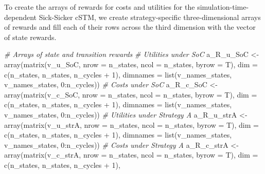 \documentclass[
]{article}
\newenvironment{Shaded}{\begin{snugshade}}{\end{snugshade}}
\newcommand{\AttributeTok}[1]{\textcolor[rgb]{0.77,0.63,0.00}{#1}}
\newcommand{\CommentTok}[1]{\textcolor[rgb]{0.56,0.35,0.01}{\textit{#1}}}
\newcommand{\DecValTok}[1]{\textcolor[rgb]{0.00,0.00,0.81}{#1}}
\newcommand{\FunctionTok}[1]{\textcolor[rgb]{0.00,0.00,0.00}{#1}}
\newcommand{\NormalTok}[1]{#1}
\newcommand{\OtherTok}[1]{\textcolor[rgb]{0.56,0.35,0.01}{#1}}
\newcommand{\SpecialCharTok}[1]{\textcolor[rgb]{0.00,0.00,0.00}{#1}}
\begin{document}
To create the arrays of rewards for costs and utilities for the simulation-time-dependent Sick-Sicker cSTM, we create strategy-specific three-dimensional arrays of rewards and fill each of their rows across the third dimension with the vector of state rewards.

\begin{Shaded}
\begin{Highlighting}[]
\CommentTok{\# Arrays of state and transition rewards}
\CommentTok{\# Utilities under SoC}
\NormalTok{a\_R\_u\_SoC }\OtherTok{\textless{}{-}} \FunctionTok{array}\NormalTok{(}\FunctionTok{matrix}\NormalTok{(v\_u\_SoC, }\AttributeTok{nrow =}\NormalTok{ n\_states, }\AttributeTok{ncol =}\NormalTok{ n\_states, }\AttributeTok{byrow =}\NormalTok{ T), }
                  \AttributeTok{dim =} \FunctionTok{c}\NormalTok{(n\_states, n\_states, n\_cycles }\SpecialCharTok{+} \DecValTok{1}\NormalTok{),}
                  \AttributeTok{dimnames =} \FunctionTok{list}\NormalTok{(v\_names\_states, v\_names\_states, }\DecValTok{0}\SpecialCharTok{:}\NormalTok{n\_cycles))}
\CommentTok{\# Costs under SoC}
\NormalTok{a\_R\_c\_SoC }\OtherTok{\textless{}{-}} \FunctionTok{array}\NormalTok{(}\FunctionTok{matrix}\NormalTok{(v\_c\_SoC, }\AttributeTok{nrow =}\NormalTok{ n\_states, }\AttributeTok{ncol =}\NormalTok{ n\_states, }\AttributeTok{byrow =}\NormalTok{ T), }
                  \AttributeTok{dim =} \FunctionTok{c}\NormalTok{(n\_states, n\_states, n\_cycles }\SpecialCharTok{+} \DecValTok{1}\NormalTok{),}
                  \AttributeTok{dimnames =} \FunctionTok{list}\NormalTok{(v\_names\_states, v\_names\_states, }\DecValTok{0}\SpecialCharTok{:}\NormalTok{n\_cycles))}
\CommentTok{\# Utilities under Strategy A}
\NormalTok{a\_R\_u\_strA }\OtherTok{\textless{}{-}}  \FunctionTok{array}\NormalTok{(}\FunctionTok{matrix}\NormalTok{(v\_u\_strA, }\AttributeTok{nrow =}\NormalTok{ n\_states, }\AttributeTok{ncol =}\NormalTok{ n\_states, }\AttributeTok{byrow =}\NormalTok{ T), }
                  \AttributeTok{dim =} \FunctionTok{c}\NormalTok{(n\_states, n\_states, n\_cycles }\SpecialCharTok{+} \DecValTok{1}\NormalTok{),}
                  \AttributeTok{dimnames =} \FunctionTok{list}\NormalTok{(v\_names\_states, v\_names\_states, }\DecValTok{0}\SpecialCharTok{:}\NormalTok{n\_cycles))}
\CommentTok{\# Costs under Strategy A}
\NormalTok{a\_R\_c\_strA }\OtherTok{\textless{}{-}} \FunctionTok{array}\NormalTok{(}\FunctionTok{matrix}\NormalTok{(v\_c\_strA, }\AttributeTok{nrow =}\NormalTok{ n\_states, }\AttributeTok{ncol =}\NormalTok{ n\_states, }\AttributeTok{byrow =}\NormalTok{ T), }
                  \AttributeTok{dim =} \FunctionTok{c}\NormalTok{(n\_states, n\_states, n\_cycles }\SpecialCharTok{+} \DecValTok{1}\NormalTok{),}

\end{Highlighting}
\end{Shaded}
\end{document}
